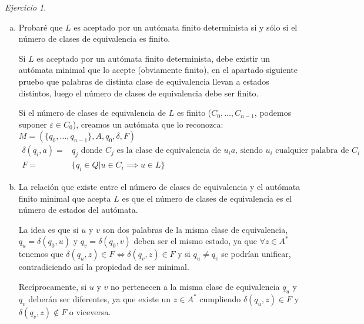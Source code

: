 \documentclass[12pt,spanish]{article}
\theoremstyle{definition}
\theoremstyle{remark}
\newtheorem{exercise}{Ejercicio}%
\begin{document}
\begin{exercise}
\begin{enumerate}[a)]
  \item Probaré que $L$ es aceptado por un autómata finito
    determinista si y sólo si el número de clases de equivalencia es
    finito.

    Si $L$ es aceptado por un autómata finito determinista, debe
    existir un autómata minimal que lo acepte (obviamente finito), en
    el apartado siguiente pruebo que palabras de distinta clase de
    equivalencia llevan a estados distintos, luego el número de clases
    de equivalencia debe ser finito.

    Si el número de clases de equivalencia de $L$ es finito
    ($C_0,\ldots,C_{n-1}$, podemos suponer $\varepsilon \in C_0$),
    creamos un autómata que lo reconozca:
    $M=(\{q_0,\ldots,q_{n-1}\},A,q_0,\delta,F)$
    \begin{align*}
      \delta(q_i,a)=&q_j \text{ donde $C_j$ es la clase de equivalencia de $u_ia$, siendo $u_i$ cualquier palabra de $C_i$}\\
      F=&\{q_i \in Q | u \in C_i \implies u \in L\}
    \end{align*}

  \item La relación que existe entre el número de clases de
    equivalencia y el autómata finito minimal que acepta $L$ es que el
    número de clases de equivalencia es el número de estados del
    autómata.

    La idea es que si $u$ y $v$ son dos palabras de la misma clase de
    equivalencia, $q_u=\delta(q_0,u)$ y $q_v=\delta(q_0,v)$ deben ser
    el mismo estado, ya que $\forall z \in A^*$ tenemos que
    $\delta(q_u,z) \in F \Leftrightarrow \delta(q_v,z) \in F$ y si
    $q_u \neq q_v$ se podrían unificar, contradiciendo así la
    propiedad de ser minimal.

    Recíprocamente, si $u$ y $v$ no pertenecen a la misma clase de
    equivalencia $q_u$ y $q_v$ deberán ser diferentes, ya que existe
    un $z\in A^*$ cumpliendo $\delta(q_u,z) \in F$ y
    $\delta(q_v,z) \notin F$ o viceversa.
  \end{enumerate}
  
\end{exercise}
\end{document}
